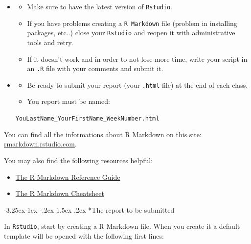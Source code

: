 \documentclass[]{book}
\makeatletter
\providecommand{\tightlist}{%
  \setlength{\itemsep}{0pt}\setlength{\parskip}{0pt}}
\newenvironment{rmdblock}[1]
  {\begin{shaded*}
  \begin{itemize}
  \renewcommand{\labelitemi}{
    \raisebox{-.7\height}[0pt][0pt]{
      {\setkeys{Gin}{width=2em,keepaspectratio}\texttt{[image: img/icons/\#1]}}
    }
  }
  \item
  }
  {
  \end{itemize}
  \end{shaded*}
  }
\newenvironment{rmdcaution}
  {\begin{rmdblock}{caution}}
  {\end{rmdblock}}
\renewcommand\subsection{\@startsection{subsection}{2}{\z@}%
                                     {-3.25ex\@plus -1ex \@minus -.2ex}%
                                     {1.5ex \@plus .2ex}%
                                     {\normalfont\large\bfseries\color{Violet}}}
\theoremstyle{definition}
\theoremstyle{definition}
\theoremstyle{definition}
\theoremstyle{remark}
\makeatother
\begin{document}
\begin{rmdcaution}
\begin{itemize}
\tightlist
\item
  Make sure to have the latest version of \texttt{Rstudio}.
\item
  If you have problems creating a \texttt{R\ Markdown} file (problem in
  installing packages, etc..) close your \texttt{Rstudio} and reopen it
  with administrative tools and retry.
\item
  If it doesn't work and in order to not lose more time, write your
  script in an \texttt{.R} file with your comments and submit it.
\end{itemize}
\end{rmdcaution}

\begin{rmdcaution}
\begin{itemize}
\item
  Be ready to submit your report (your \texttt{.html} file) at the end
  of each class.
\item
  You report must be named:
\end{itemize}

\texttt{YouLastName\_YourFirstName\_WeekNumber.html}
\end{rmdcaution}

You can find all the informations about R Markdown on this site:
\href{http://rmarkdown.rstudio.com/lesson-1.html}{rmarkdown.rstudio.com}.

You may also find the following resources helpful:

\begin{itemize}
\tightlist
\item
  \href{https://www.rstudio.com/wp-content/uploads/2015/03/rmarkdown-reference.pdf}{The
  R Markdown Reference Guide}
\item
  \href{https://www.rstudio.com/wp-content/uploads/2016/03/rmarkdown-cheatsheet-2.0.pdf}{The
  R Markdown Cheatsheet}
\end{itemize}

\subsection*{The report to be
submitted}\label{the-report-to-be-submitted}

In \texttt{Rstudio}, start by creating a R Markdown file. When you
create it a default template will be opened with the following first
lines:
\end{document}
